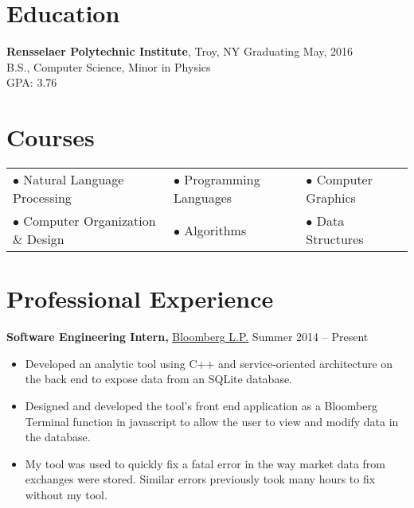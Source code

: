 \documentclass[margin]{res}
\begin{document}
 
\begin{minipage}{\textwidth}

 
\address{{\bf Present Address} \\ 2166 14th St \\ 2nd Floor \\ Troy, NY 12180 }
\address{{\bf Permanent Address} \\ 4 Oak Street \\ Cumberland, ME 04021 }
\begin{resume} 
 
\section{Education} 
{\bf Rensselaer Polytechnic Institute}, Troy, NY \hfill Graduating May, 2016 \\
B.S., Computer Science, Minor in Physics \\
GPA: 3.76
 
\section{Courses}
\begin{tabular}{lll}
$\bullet$ Natural Language Processing & $\bullet$ Programming Languages & $\bullet$ Computer Graphics \\
$\bullet$ Computer Organization \& Design & $\bullet$ Algorithms & $\bullet$ Data Structures \\
\end{tabular}

\section{Professional Experience}
{\bf Software Engineering Intern,} \uline{Bloomberg L.P.} \hfill Summer 2014 -- Present
 \begin{itemize} \itemsep -2pt
 \item Developed an analytic tool using C++ and service-oriented architecture on the back end to expose data from an SQLite database.
 \item Designed and developed the tool's front end application as a Bloomberg Terminal function in javascript to allow the user to view and modify data in the database.
 \item My tool was used to quickly fix a fatal error in the way market data from exchanges were stored. Similar errors previously took many hours to fix without my tool.
 \end{itemize}




\end{resume}
\end{minipage}
\end{document}
